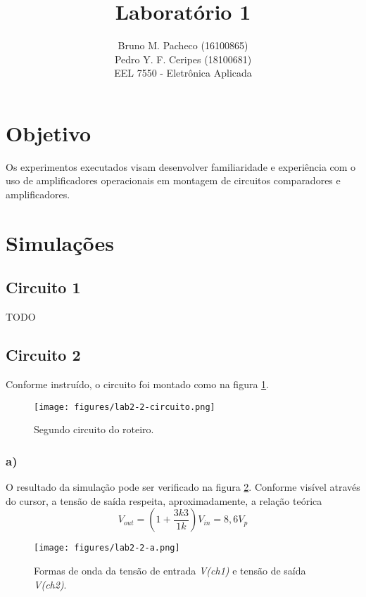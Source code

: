 \documentclass[a4paper]{report}
\begin{document}
 
\title{Laboratório 1}
\author{Bruno M. Pacheco (16100865)\\
Pedro Y. F. Ceripes (18100681) \\
EEL 7550 - Eletrônica Aplicada}
 
\maketitle

\section*{Objetivo}
 
Os experimentos executados visam desenvolver familiaridade e experiência com o uso de amplificadores operacionais em montagem de circuitos comparadores e amplificadores.
 
\section*{Simulações}

\subsection*{Circuito 1}

TODO

\subsection*{Circuito 2}

Conforme instruído, o circuito foi montado como na figura \ref{fig:figures-lab2-2-circuito-png}.

\begin{figure}[H]
    \centering
    \texttt{[image: figures/lab2-2-circuito.png]}
    \caption{Segundo circuito do roteiro.}
    \label{fig:figures-lab2-2-circuito-png}
\end{figure}

\subsubsection*{a)}

O resultado da simulação pode ser verificado na figura \ref{fig:figures-lab2-2-a-png}. Conforme visível através do cursor, a tensão de saída respeita, aproximadamente, a relação teórica \[
V_{out}= \left( 1+\frac{3k3}{1k} \right)V_{in} = 8,6 V_p
\] 

\begin{figure}[H]
    \centering
    \texttt{[image: figures/lab2-2-a.png]}
    \caption{Formas de onda da tensão de entrada \emph{V(ch1)} e tensão de saída \emph{V(ch2)}.}
    \label{fig:figures-lab2-2-a-png}
\end{figure}
\end{document}
